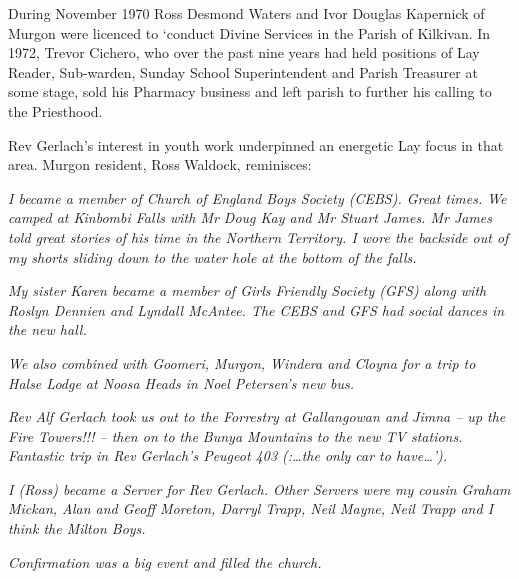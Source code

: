 During November 1970 Ross Desmond Waters and Ivor Douglas Kapernick of Murgon were licenced to `conduct Divine Services in the Parish of Kilkivan. In 1972, Trevor Cichero, who over the past nine years had held positions of Lay Reader, Sub-warden, Sunday School Superintendent and Parish Treasurer at some stage, sold his Pharmacy business and left parish to further his calling to the Priesthood.



Rev Gerlach's interest in youth work underpinned an energetic Lay focus in that area. Murgon resident, Ross Waldock, reminisces:



\emph{I became a member of Church of England Boys Society (CEBS). Great times. We camped at Kinbombi Falls with Mr Doug Kay and Mr Stuart James. Mr James told great stories of his time in the Northern Territory. I wore the backside out of my shorts sliding down to the water hole at the bottom of the falls.}



\emph{My sister Karen became a member of Girls Friendly Society (GFS) along with Roslyn Dennien and Lyndall McAntee. The CEBS and GFS had social dances in the new hall.}



\emph{We also combined with Goomeri, Murgon, Windera and Cloyna for a trip to Halse Lodge at Noosa Heads in Noel Petersen's new bus.}



\emph{Rev Alf Gerlach took us out to the Forrestry at Gallangowan and Jimna -- up the Fire Towers!!! -- then on to the Bunya Mountains to the new TV stations. Fantastic trip in Rev Gerlach's Peugeot 403 (:\ldots the only car to have\ldots').}



\emph{I (Ross) became a Server for Rev Gerlach. Other Servers were my cousin Graham Mickan, Alan and Geoff Moreton, Darryl Trapp, Neil Mayne, Neil Trapp and I think the Milton Boys.}



\emph{Confirmation was a big event and filled the church.}




